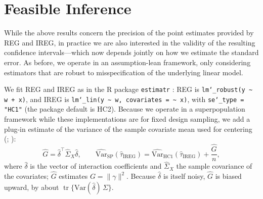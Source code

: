 \documentclass{article}
\newcommand{\htau}{\hat{\tau}}
\newcommand{\hdelta}{\hat{\delta}}
\DeclareMathOperator{\tr}{tr}
\newcommand{\IREG}{\mathrm{IREG}}
\theoremstyle{plain}
\theoremstyle{definition}
\theoremstyle{remark}
\begin{document}
\section{Feasible Inference}
\label{sec:feasible}

While the above results concern the precision of the point estimates provided by REG and IREG, in practice we are also interested in the validity of the resulting confidence intervals---which now depends jointly on how we estimate the standard error. As before, we operate in an assumption-lean framework, only considering estimators that are robust to misspecification of the underlying linear model.


We fit REG and IREG as in the R package \texttt{estimatr} \citep{estimatr}: REG is \texttt{lm\char`\_robust(y \textasciitilde{} w + x)}, and IREG is \texttt{lm\char`\_lin(y \textasciitilde{} w, covariates = \textasciitilde{} x)}, with \texttt{se\char`\_type = "HC1"} (the package default is HC2). Because we operate in a superpopulation framework while these implementations are for fixed design sampling, we add a plug-in estimate of the variance of the sample covariate mean used for centering (\citealp[Section~5.3]{imbens2009recent}; \citealp{negi2021revisiting}):
\begin{equation}
\label{eq:vsp}
\hat G=\hdelta^\top\hat\Sigma_X\hdelta,
\qquad
\widehat{\mathrm{Var}}_{\mathrm{SP}}(\htau_\IREG)=\widehat{\mathrm{Var}}_{\mathrm{HC1}}(\htau_\IREG)+\frac{\hat G}{n},
\end{equation}
where $\hdelta$ is the vector of interaction coefficients and $\hat\Sigma_X$ the sample covariance of the covariates; $\hat G$ estimates $G=\|\gamma\|^2$. Because $\hdelta$ is itself noisy, $\hat G$ is biased upward, by about $\tr\{\mathrm{Var}(\hdelta)\,\Sigma\}$.
\end{document}
